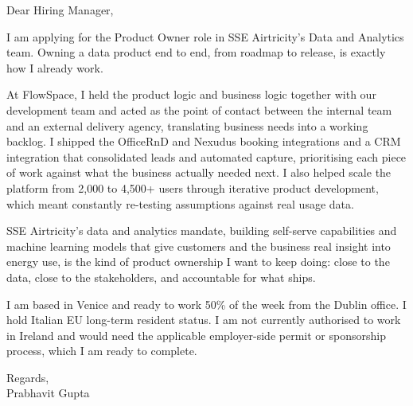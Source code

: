 \documentclass[a4paper,11pt]{article}
\begin{document}
Dear Hiring Manager,

I am applying for the Product Owner role in SSE Airtricity's Data and Analytics team. Owning a data product end to end, from roadmap to release, is exactly how I already work.

At FlowSpace, I held the product logic and business logic together with our development team and acted as the point of contact between the internal team and an external delivery agency, translating business needs into a working backlog. I shipped the OfficeRnD and Nexudus booking integrations and a CRM integration that consolidated leads and automated capture, prioritising each piece of work against what the business actually needed next. I also helped scale the platform from 2,000 to 4,500+ users through iterative product development, which meant constantly re-testing assumptions against real usage data.

SSE Airtricity's data and analytics mandate, building self-serve capabilities and machine learning models that give customers and the business real insight into energy use, is the kind of product ownership I want to keep doing: close to the data, close to the stakeholders, and accountable for what ships.

I am based in Venice and ready to work 50\% of the week from the Dublin office. I hold Italian EU long-term resident status. I am not currently authorised to work in Ireland and would need the applicable employer-side permit or sponsorship process, which I am ready to complete.

Regards,\\
Prabhavit Gupta
\end{document}
